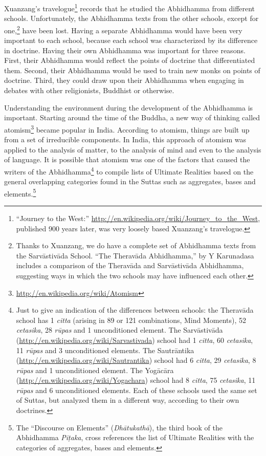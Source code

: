 \pagebreak

Xuanzang’s travelogue\footnote{“Journey to the West:” \url{http://en.wikipedia.org/wiki/Journey_to_the_West}, published 900 years later, was very loosely based Xuanzang’s travelogue.} records that he studied the Abhidhamma from different schools. Unfortunately, the Abhidhamma texts from the other schools, except for one,\footnote{Thanks to Xuanzang, we do have a complete set of Abhidhamma texts from the Sarvāstivāda School. “The Theravāda Abhidhamma,” by Y Karunadasa includes a comparison of the Theravāda and Sarvāstivāda Abhidhamma, suggesting ways in which the two schools may have influenced each other.} have been lost. Having a separate Abhidhamma would have been very important to each school, because each school was characterized by its difference in doctrine. Having their own Abhidhamma was important for three reasons. First, their Abhidhamma would reflect the points of doctrine that differentiated them. Second, their Abhidhamma would be used to train new monks on points of doctrine. Third, they could draw upon their Abhidhamma when engaging in debates with other religionists, Buddhist or otherwise.

Understanding the environment during the development of the Abhidhamma is important. Starting around the time of the Buddha, a new way of thinking called atomism\footnote{\url{http://en.wikipedia.org/wiki/Atomism}} became popular in India. According to atomism, things are built up from a set of irreducible components. In India, this approach of atomism was applied to the analysis of matter, to the analysis of mind and even to the analysis of language. It is possible that atomism was one of the factors that caused the writers of the Abhidhamma\footnote{Just to give an indication of the differences between schools: the Theravāda school has 1 \textit{citta} (arising in 89 or 121 combinations, Mind Moments), 52 \textit{cetasika}, 28 \textit{rūpas} and 1 unconditioned element. The Sarvāstivāda (\url{http://en.wikipedia.org/wiki/Sarvastivada}) school had 1 \textit{citta}, 60 \textit{cetasika}, 11 \textit{rūpas} and 3 unconditioned elements. The Sautrāntika (\url{http://en.wikipedia.org/wiki/Sautrantika}) school had 6 \textit{citta}, 29 \textit{cetasika}, 8 \textit{rūpas} and 1 unconditioned element. The Yogācāra (\url{http://en.wikipedia.org/wiki/Yogachara}) school had 8 \textit{citta}, 75 \textit{cetasika}, 11 \textit{rūpas} and 6 unconditioned elements. Each of these schools used the same set of Suttas, but analyzed them in a different way, according to their own doctrines.} to compile lists of Ultimate Realities based on the general overlapping categories found in the Suttas such as aggregates, bases and elements.\footnote{The “Discourse on Elements” (\textit{Dhātukathā}), the third book of the Abhidhamma \textit{Piṭaka}, cross references the list of Ultimate Realities with the categories of aggregates, bases and elements.}

